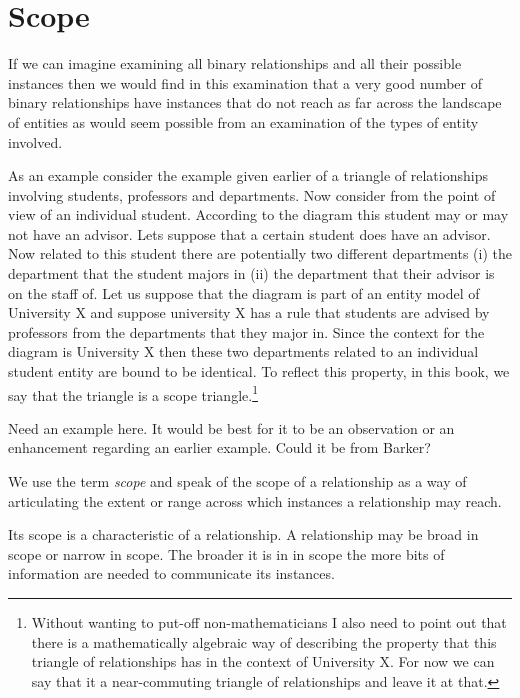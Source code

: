 
\section{Scope}
\label{Scope}
If we can imagine examining all binary relationships and all their possible instances then we would find in this examination that a very  good number of  binary relationships have instances that  do not reach as far across the landscape of entities as would seem possible from an examination of the types of entity involved.

\mynote As an example consider the example given earlier of a triangle of relationships involving students, professors and departments. 
Now consider from the point of view of an individual student. 
According to the diagram this student may or may not have an advisor. Lets suppose that a certain student does have an advisor. Now related to this student there are potentially two different departments (i) the department that the student majors in (ii) the department that their advisor is on the staff of. Let us suppose that the diagram is part of an entity model of University X and suppose university X has a rule that students are advised by professors from the departments that they major in. Since the context for the diagram is University X then these two departments related to an individual student entity are bound to be identical. To reflect this property, in this book, we say that the triangle is a scope triangle.\footnote{Without wanting to put-off non-mathematicians I also need to point out that there is a mathematically algebraic way of describing the property that this triangle of relationships has in the context of University X. For now we can say that it a near-commuting triangle of relationships and leave it at that.}   


\begin{noteforfuture}Need an example here. It would be best for it to be an observation or an enhancement regarding an earlier example. Could it be from Barker?
\end{noteforfuture}

We use the term \textit{scope} and speak of the scope of a relationship as a way of articulating the  extent or range across which instances a relationship may reach.  

Its scope is a characteristic of a relationship. A relationship may be broad in scope or narrow in scope. The broader it is in in scope the more bits of information are needed to communicate its instances. 

